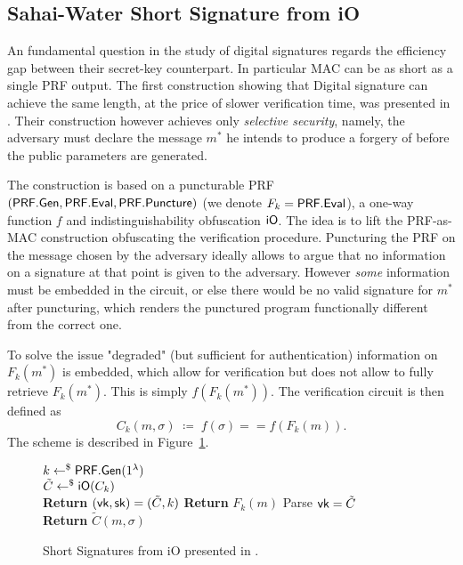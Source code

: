 \subsection{Sahai-Water Short Signature from iO}
An fundamental question in the study of digital signatures regards the efficiency gap between their secret-key counterpart.
In particular MAC can be as short as a single PRF output.
The first construction showing that Digital signature can achieve the same length, at the price of slower verification time, was presented in \cite{STOC:SahWat14}.
Their construction however achieves only \textit{selective security}, namely, the adversary must declare the message $m^\ast$ he intends to produce a forgery of before the public parameters are generated.

The construction is based on a puncturable PRF $(\mathsf{PRF.Gen}, \allowbreak \mathsf{PRF.Eval}, \allowbreak \mathsf{PRF.Puncture})$ (we denote $F_k = \mathsf{PRF.Eval}$), a one-way function $f$ and indistinguishability obfuscation $\mathsf{iO}$.
The idea is to lift the PRF-as-MAC  construction obfuscating the verification procedure.
Puncturing the PRF on the message chosen by the adversary ideally allows to argue that no information on a signature at that point is given to the adversary.
However \textit{some} information must be embedded in the circuit, or else there would be no valid signature for $m^\ast$ after puncturing, which renders the punctured program functionally different from the correct one.

To solve the issue "degraded" (but sufficient for authentication) information on $F_k(m^\ast)$ is embedded, which allow for verification but does not allow to fully retrieve $F_k(m^\ast)$.
This is simply $f(F_k(m^\ast))$.
The verification circuit is then defined as
\[
	C_k(m, \sigma)
		\; \coloneqq \;
	f(\sigma) == f(F_k(m)).
\]
The scheme is described in Figure~\ref{prot:SahWat14:short_signature_from_io}.

\begin{figure}[htb]
	\centering
	\begin{pchstack}[center, space=10pt]
		{
			$k \gets^{\$} \mathsf{PRF.Gen}(1^\lambda)$
				\\
			$\tilde{C} \gets^{\$} \mathsf{iO}(C_k)$
				\\
			\textbf{Return} $(\vk, \sk) = (\tilde{C}, k)$
		}
		{
			\textbf{Return} $F_k(m)$
		}
		{
			Parse $\vk = \tilde{C}$
				\\
			\textbf{Return} $\tilde{C}(m, \sigma)$	
		}
	\end{pchstack}
	\label{prot:SahWat14:short_signature_from_io}
	\caption{Short Signatures from iO presented in \cite{STOC:SahWat14}.}
\end{figure}

